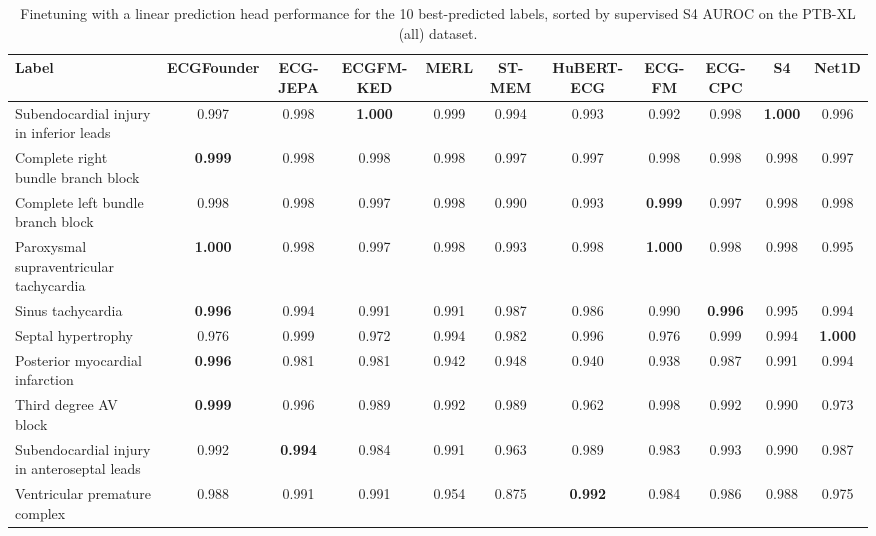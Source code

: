 \documentclass{article}
\begin{document}
                \begin{table}[htbp]
                    \centering
                    \tiny
                    \setlength{\tabcolsep}{2pt}
                    \caption{Finetuning with a linear prediction head performance for the 10 best-predicted labels, sorted by supervised S4 AUROC on the PTB-XL (all) dataset.}
                    \begin{tabular}{lcccccccccc}
                        \toprule
                        \textbf{Label} & \textbf{ECGFounder} & \textbf{ECG-JEPA} & \textbf{ECGFM-KED} & \textbf{MERL} & \textbf{ST-MEM} & \textbf{HuBERT-ECG} & \textbf{ECG-FM} & \textbf{ECG-CPC} & \textbf{S4} & \textbf{Net1D} \\
                        \midrule
                        Subendocardial injury in inferior leads & 0.997 & 0.998 & \textbf{1.000} & 0.999 & 0.994 & 0.993 & 0.992 & 0.998 & \textbf{1.000} & 0.996 \\
                        Complete right bundle branch block & \textbf{0.999} & 0.998 & 0.998 & 0.998 & 0.997 & 0.997 & 0.998 & 0.998 & 0.998 & 0.997 \\
                        Complete left bundle branch block & 0.998 & 0.998 & 0.997 & 0.998 & 0.990 & 0.993 & \textbf{0.999} & 0.997 & 0.998 & 0.998 \\
                        Paroxysmal supraventricular tachycardia & \textbf{1.000} & 0.998 & 0.997 & 0.998 & 0.993 & 0.998 & \textbf{1.000} & 0.998 & 0.998 & 0.995 \\
                        Sinus tachycardia & \textbf{0.996} & 0.994 & 0.991 & 0.991 & 0.987 & 0.986 & 0.990 & \textbf{0.996} & 0.995 & 0.994 \\
                        Septal hypertrophy & 0.976 & 0.999 & 0.972 & 0.994 & 0.982 & 0.996 & 0.976 & 0.999 & 0.994 & \textbf{1.000} \\
                        Posterior myocardial infarction & \textbf{0.996} & 0.981 & 0.981 & 0.942 & 0.948 & 0.940 & 0.938 & 0.987 & 0.991 & 0.994 \\
                        Third degree AV block & \textbf{0.999} & 0.996 & 0.989 & 0.992 & 0.989 & 0.962 & 0.998 & 0.992 & 0.990 & 0.973 \\
                        Subendocardial injury in anteroseptal leads & 0.992 & \textbf{0.994} & 0.984 & 0.991 & 0.963 & 0.989 & 0.983 & 0.993 & 0.990 & 0.987 \\
                        Ventricular premature complex & 0.988 & 0.991 & 0.991 & 0.954 & 0.875 & \textbf{0.992} & 0.984 & 0.986 & 0.988 & 0.975 \\
                        \bottomrule
                    \end{tabular}
                    \label{tab:results_overview_ptbxlall}
                \end{table}
\end{document}
